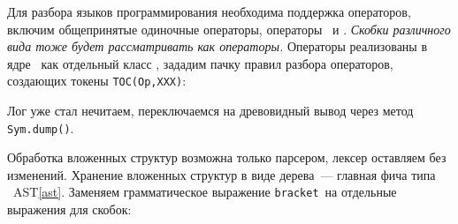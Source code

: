 \label{miniops}

Для разбора языков программирования необходима поддержка операторов,
включим общепринятые одиночные операторы, операторы \cpp\ и \bi.
\emph{Скобки различного вида тоже будет рассматривать как операторы.}
Операторы реализованы в ядре \bi\ как отдельный класс , зададим
пачку правил разбора операторов, создающих токены \verb|TOC(Op,XXX)|:



Лог уже стал нечитаем, переключаемся на древовидный вывод через метод
\verb|Sym.dump()|.



Обработка вложенных структур возможна только парсером, лексер оставляем
без изменений. Хранение вложенных структур в виде дерева\ --- главная фича
типа \bi\ AST\ref{ast}. Заменяем грамматическое выражение \verb|bracket|\ на
отдельные выражения для скобок:


